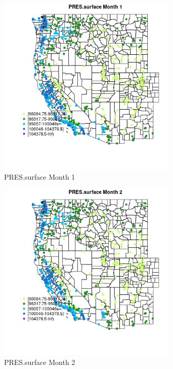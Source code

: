\begin{figure} 
\centering  
\includegraphics[width=0.77\textwidth]{Code_Outputs/Report_ML_input_PM25_Step4_part_f_de_duplicated_aveswNAs_MapObsMo1PRESsurface.jpg} 
\caption{\label{fig:Report_ML_input_PM25_Step4_part_f_de_duplicated_aveswNAsMapObsMo1PRESsurface}PRES.surface Month 1} 
\end{figure} 
 

\begin{figure} 
\centering  
\includegraphics[width=0.77\textwidth]{Code_Outputs/Report_ML_input_PM25_Step4_part_f_de_duplicated_aveswNAs_MapObsMo2PRESsurface.jpg} 
\caption{\label{fig:Report_ML_input_PM25_Step4_part_f_de_duplicated_aveswNAsMapObsMo2PRESsurface}PRES.surface Month 2} 
\end{figure} 
 

